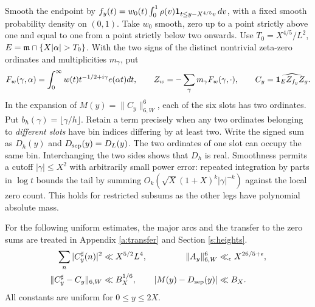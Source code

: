 \documentclass[11pt,a4paper]{article}
\begin{document}
Smooth the endpoint by \(f_y(t)=w_0(t)\int_0^1\rho(v)\mathbf1_{t\le y-X^{4/5}v}\,dv\), with a fixed smooth probability density on \((0,1)\). Take \(w_0\) smooth, zero up to a point strictly above one and equal to one from a point strictly below two onwards. Use \(T_0=X^{4/5}/L^2\), \(E=\mm\cap\{X|\alpha|>T_0\}\). With the two signs of the distinct nontrivial zeta-zero ordinates and multiplicities \(m_\gamma\), put
\[
 F_w(\gamma,\alpha)=\int_0^\infty w(t)t^{-1/2+i\gamma}e(\alpha t)dt,\qquad
 Z_w=-\sum_\gamma m_\gamma F_w(\gamma,\cdot),\qquad
 C_y=\widehat{\mathbf1_E Z_{f_y}Z_g}.
\]
In the expansion of \(M(y)=\|C_y\|_{6,W}^6\), each of the six slots has two ordinates. Put \(b_h(\gamma)=\lfloor\gamma/h\rfloor\). Retain a term precisely when any two ordinates belonging to \emph{different slots} have bin indices differing by at least two. Write the signed sum as \(D_h(y)\) and \(D_{{\mathrm{sep}}}(y)=D_L(y)\). The two ordinates of one slot can occupy the same bin. Interchanging the two sides shows that \(D_h\) is real. Smoothness permits a cutoff \(|\gamma|\le X^2\) with arbitrarily small power error: repeated integration by parts in \(\log t\) bounds the tail by summing \(O_k(\sqrt X(1+X)^k|\gamma|^{-k})\) against the local zero count. This holds for restricted subsums as the other legs have polynomial absolute mass.

For the following uniform estimates, the major arcs and the transfer to the zero sums are treated in Appendix \ref{a:transfer} and Section \ref{s:heights}.
\begin{align}
 \sum_n|C_y^\sharp(n)|^2&\ll X^{5/2}L^4,&
 \|A_y\|_{6,W}^6&\ll_\epsilon X^{26/5+\epsilon},\label{eq:major}\\
 \|C_y^\sharp-C_y\|_{6,W}&\ll B_X^{1/6},&
 |M(y)-D_{{\mathrm{sep}}}(y)|&\ll B_X .\label{eq:transfer}
\end{align}
All constants are uniform for \(0\le y\le2X\).
\end{document}
